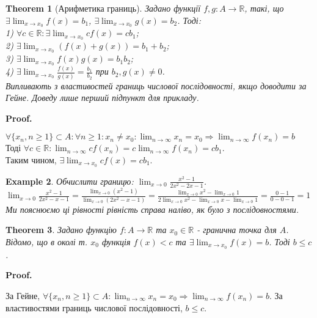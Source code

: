 \documentclass[a4paper, 14pt]{article}
\makeatletter
\def\huge{\displaystyle}
\def\qed{$\blacksquare$}
\theoremstyle{theoremdd}
\newtheorem{theorem}{Theorem}[subsection]
\theoremstyle{theoremdd}
\theoremstyle{theoremdd}
\theoremstyle{theoremdd}
\newtheorem{example}[theorem]{Example}
\theoremstyle{theoremdd}
\theoremstyle{theoremdd}
\theoremstyle{theoremdd}
\theoremstyle{theoremdd}
\renewenvironment{proof}[1][Proof.\\]{\par
\pushQED{\hfill \qed}%
\normalfont \topsep6\p@\@plus6\p@\relax
\trivlist
\item\relax
{\bfseries
#1\@addpunct{.}}\hspace\labelsep\ignorespaces
}{%
\popQED\endtrivlist\@endpefalse
}
\makeatother
\begin{document}
	\begin{theorem}[Арифметика границь]
	Задано функції $f,g: A \to \mathbb{R}$, такі, що $\exists \huge \lim_{x \to x_0} f(x) = b_1$, $\exists \huge \lim_{x \to x_0} g(x) = b_2$. Тоді:\\
	1) $\forall c \in \mathbb{R}: \exists \huge \lim_{x \to x_0} cf(x) = c b_1$;\\
	2) $\exists \huge \lim_{x \to x_0} (f(x)+g(x)) = b_1 + b_2$;\\
	3) $\exists \huge \lim_{x \to x_0} f(x)g(x) = b_1 b_2$;\\
	4) $\exists \huge \lim_{x \to x_0} \frac{f(x)}{g(x)} = \frac{b_1}{b_2}$ при $b_2, g(x) \neq 0$.\\
	\textit{Випливають з властивостей границь числової послідовності, якщо доводити за Гейне. Доведу лише перший підпункт для прикладу.}
	\end{theorem}
	
	\begin{proof}
	$\forall \{x_n, n \geq 1\} \subset A: \forall n \geq 1: x_n \neq x_0: \huge \lim_{n \to \infty} x_n = x_0 \Rightarrow \lim_{n \to \infty} f(x_n) = b$\\
	Тоді $\huge \forall c \in \mathbb{R}: \lim_{n \to \infty} c f(x_n) = c \lim_{n \to \infty} f(x_n) = c b_1$.\\
	Таким чином, $\exists \huge \lim_{x \to x_0} cf(x) = c b_1$.
	\end{proof}
	
	\begin{example}
	Обчислити границю: $\huge \lim_{x \to 0} \frac{x^2-1}{2x^2-2x-1}$.\\
	$\huge \lim_{x \to 0} \frac{x^2-1}{2x^2-x-1} = \frac{\huge \lim_{x \to 0} (x^2-1)}{\huge \lim_{x \to 0}(2x^2-x-1)} = \frac{\huge \lim_{x \to 0}x^2 - \lim_{x \to 0}1}{\huge 2\lim_{x \to 0}x^2 - \lim_{x \to 0}x - \lim_{x \to 0}1} = \frac{0-1}{0-0-1} = 1$\\
	Ми пояснюємо ці рівності рівність справа наліво, як було з послідовностями.
	\end{example}
	
	\begin{theorem}
	Задано функцію $f: A\to \mathbb{R}$ та $x_0 \in \mathbb{R}$ - гранична точка для $A$.\\
Відомо, що в околі т. $x_0$ функція $f(x) < c$ та $\exists \huge \lim_{x \to x_0} f(x) = b$. Тоді $b \leq c$.
	\end{theorem}

	\begin{proof}
За Гейне, $\huge \forall \{x_n, n \geq 1\} \subset A:  \lim_{n \to \infty} x_n = x_0 \Rightarrow \lim_{n \to \infty} f(x_n) = b$. За властивостями границь числової послідовності, $b \leq c$.
	\end{proof}
	
\end{document}
